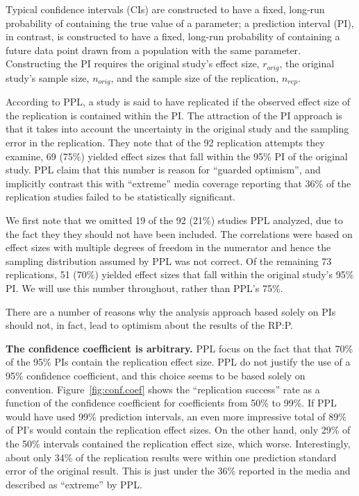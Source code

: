 \documentclass[doc,a4paper,floatsintext,draftfirst]{apa6}
\begin{document}
\nocite{Patil:etal:2016,OpenScienceCollaboration:2015}

Typical confidence intervals (CIs) are constructed to have a fixed, long-run probability of containing the true value of a parameter; a prediction interval (PI), in contrast, is constructed to have a fixed, long-run probability of containing a future data point drawn from a population with the same parameter. Constructing the PI requires the original study's effect size, $r_{orig}$, the original study's sample size, $n_{orig}$, and the sample size of the replication, $n_{rep}$. 

According to PPL, a study is said to have replicated if the observed effect size of the replication is contained within the PI. The attraction of the PI approach is that it takes into account the uncertainty in the original study and the sampling error in the replication. They note that of the 92 replication attempts they examine, 69 (75\%) yielded effect sizes that fall within the 95\% PI of the original study. PPL claim that this number is reason for ``guarded optimism'', and implicitly contrast this with ``extreme'' media coverage reporting that 36\% of the replication studies failed to be statistically significant.

We first note that we omitted 19 of the 92 (21\%) studies PPL analyzed, due to the fact they they should not have been included. The correlations were based on effect sizes with multiple degrees of freedom in the numerator and hence the sampling distribution assumed by PPL was not correct. Of the remaining 73 replications, 51 (70\%) yielded effect sizes that fall within the original study's 95\% PI. We will use this number throughout, rather than PPL's 75\%.

There are a number of reasons why the analysis approach based solely on PIs should not, in fact, lead to optimism about the results of the RP:P.

{\bf The confidence coefficient is arbitrary.} PPL focus on the fact that that 70\% of the 95\% PIs contain the replication effect size. PPL do not justify the use of a 95\% confidence coefficient, and this choice seems to be based solely on convention. Figure~\ref{fig:conf.coef} shows the ``replication success'' rate as a function of the confidence coefficient for coefficients from 50\% to 99\%. If PPL would have used 99\% prediction intervals, an even more impressive total of 89\% of PI's would contain the replication effect sizes. On the other hand, only 29\% of the 50\% intervals contained the replication effect size, which worse. Interestingly, about only 34\% of the replication results were within one prediction standard error of the original result. This is just under the 36\% reported in the media and described as ``extreme'' by PPL. 
\end{document}
